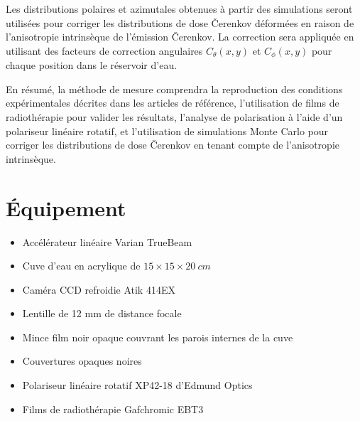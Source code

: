\documentclass{Thesis}
\begin{document}
Les distributions polaires et azimutales obtenues à partir des simulations seront utilisées pour corriger les distributions de dose Čerenkov déformées en raison de l'anisotropie intrinsèque de l'émission Čerenkov.
La correction sera appliquée en utilisant des facteurs de correction angulaires $C_{\theta}(x, y)$ et $C_{\phi}(x, y)$ pour chaque position dans le réservoir d'eau.

En résumé, la méthode de mesure comprendra la reproduction des conditions expérimentales décrites dans les articles de référence, l'utilisation de films de radiothérapie pour valider les résultats, l'analyse de polarisation à l'aide d'un polariseur linéaire rotatif, et l'utilisation de simulations Monte Carlo pour corriger les distributions de dose Čerenkov en tenant compte de l'anisotropie intrinsèque.

\section*{Équipement}
\begin{multicols}{2}
\begin{itemize}
    \setlength\itemsep{1mm}
    \item Accélérateur linéaire Varian TrueBeam
    \item Cuve d'eau en acrylique de $15 \times 15 \times \SI{20}{cm}$
    \item Caméra CCD refroidie Atik 414EX
    \item Lentille de 12 mm de distance focale
    \item Mince film noir opaque couvrant les parois internes de la cuve
    \item Couvertures opaques noires
    \item Polariseur linéaire rotatif XP42-18 d'Edmund Optics
    \item Films de radiothérapie Gafchromic EBT3
\end{itemize}
\end{multicols}

\newpage
\printbibliography
\end{document}
